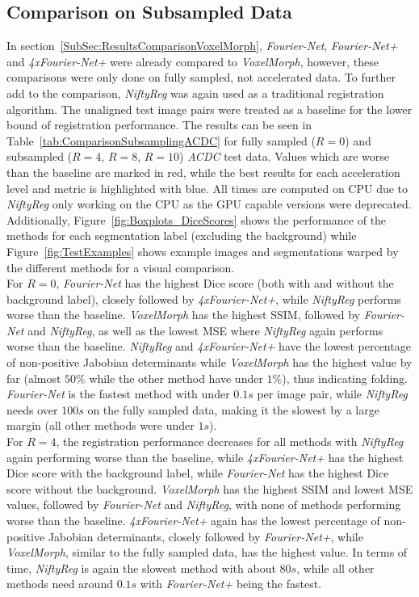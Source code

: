\subsection{Comparison on Subsampled Data} \label{SubSec:ResultsComparisonSubsampling}
In section~\ref{SubSec:ResultsComparisonVoxelMorph}, \emph{Fourier-Net}, \emph{Fourier-Net+} and \emph{4xFourier-Net+} were already compared to \emph{VoxelMorph}, however, these comparisons were only done on fully sampled, not accelerated data. To further add to the comparison, \emph{NiftyReg} was again used as a traditional registration algorithm. The unaligned test image pairs were treated as a baseline for the lower bound of registration performance. The results can be seen in Table~\ref{tab:ComparisonSubsamplingACDC} for fully sampled ($R=0$) and subsampled ($R=4$, $R=8$, $R=10$) \emph{ACDC} test data. Values which are worse than the baseline are marked in red, while the best results for each acceleration level and metric is highlighted with blue. All times are computed on CPU due to \emph{NiftyReg} only working on the CPU as the GPU capable versions were deprecated. Additionally, Figure~\ref{fig:Boxplots_DiceScores} shows the performance of the methods for each segmentation label (excluding the background) while Figure~\ref{fig:TestExamples} shows example images and segmentations warped by the different methods for a visual comparison.\\
For $R=0$, \emph{Fourier-Net} has the highest Dice score (both with and without the background label), closely followed by \emph{4xFourier-Net+}, while \emph{NiftyReg} performs worse than the baseline. \emph{VoxelMorph} has the highest SSIM, followed by \emph{Fourier-Net} and \emph{NiftyReg}, as well as the lowest MSE where \emph{NiftyReg} again performs worse than the baseline. \emph{NiftyReg} and \emph{4xFourier-Net+} have the lowest percentage of non-positive Jabobian determinants while \emph{VoxelMorph} has the highest value by far (almost $50\%$ while the other method have under $1\%$), thus indicating folding. \emph{Fourier-Net} is the fastest method with under $0.1s$ per image pair, while \emph{NiftyReg} needs over $100s$ on the fully sampled data, making it the slowest by a large margin (all other methods were under $1s$).\\
For $R=4$, the registration performance decreases for all methods with \emph{NiftyReg} again performing worse than the baseline, while \emph{4xFourier-Net+} has the highest Dice score with the background label, while \emph{Fourier-Net} has the highest Dice score without the background. \emph{VoxelMorph} has the highest SSIM and lowest MSE values, followed by \emph{Fourier-Net} and \emph{NiftyReg}, with none of methods performing worse than the baseline. \emph{4xFourier-Net+} again has the lowest percentage of non-positive Jabobian determinants, closely followed by \emph{Fourier-Net+}, while \emph{VoxelMorph}, similar to the fully sampled data, has the highest value. In terms of time, \emph{NiftyReg} is again the slowest method with about $80s$, while all other methods need around $0.1s$ with \emph{Fourier-Net+} being the fastest.\\
